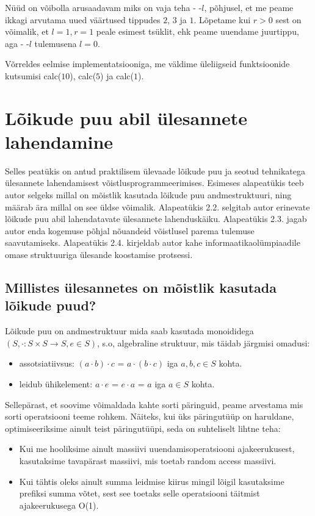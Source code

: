 \documentclass{trkut}
\theoremstyle{definition}
\begin{document}
Nüüd on võibolla arusaadavam miks on vaja teha - -$l$, põhjusel, et me peame ikkagi arvutama uued väärtused tippudes $2$, $3$ ja $1$.
Lõpetame kui $r > 0$ sest on võimalik, et $l = 1$, $r = 1$ peale esimest tsüklit, ehk peame uuendame juurtippu, aga - -$l$ tulemusena $l = 0$.

Võrreldes eelmise implementatsiooniga, me väldime üleliigseid funktsioonide kutsumisi calc($10$), calc($5$) ja calc($1$).




\chapter{Lõikude puu abil ülesannete lahendamine}
Selles peatükis on antud praktilisem ülevaade lõikude puu ja seotud tehnikatega ülesannete lahendamisest võistlusprogrammeerimises.
Esimeses alapeatükis teeb autor selgeks millal on mõistlik kasutada lõikude puu andmestruktuuri, ning määrab ära millal on see üldse võimalik. 
Alapeatükis 2.2. selgitab autor erinevate lõikude puu abil lahendatavate ülesannete lahenduskäiku. Alapeatükis 2.3. jagab autor enda kogemuse põhjal nõuandeid võistlusel parema tulemuse saavutamiseks. Alapeatükis 2.4. kirjeldab autor kahe informaatikaolümpiaadile omase struktuuriga ülesande koostamise protsessi.
\section{Millistes ülesannetes on mõistlik kasutada lõikude puud?} 
Lõikude puu on andmestruktuur mida saab kasutada monoididega $(S, \cdot: S \times S \to S, e \in S)$, s.o, algebraline struktuur, mis täidab järgmisi omadusi:
\begin{itemize}
    \item assotsiatiivsus: $(a \cdot b) \cdot c$ = $a \cdot (b \cdot c)$ iga $a, b, c \in S$ kohta.
    \item leidub ühikelement: $a \cdot e$ = $e \cdot a$ = $a$ iga $a \in S$ kohta.
\end{itemize}

Sellepärast, et soovime võimaldada kahte sorti päringuid, peame arvestama mis sorti operatsiooni teeme rohkem. Näiteks, kui üks päringutüüp on haruldane, optimiseeriksime ainult teist päringutüüpi, seda on suhteliselt lihtne teha:

\begin{itemize}
    \item Kui me hooliksime ainult massiivi uuendamisoperatsiooni ajakeerukusest, kasutaksime tavapärast massiivi, mis toetab random access massiivi.
    \item Kui tähtis oleks ainult summa leidmise kiirus mingil lõigil kasutaksime prefiksi summa võtet, sest see toetaks selle operatsiooni täitmist ajakeerukusega O(1).
\end{itemize}
\end{document}
